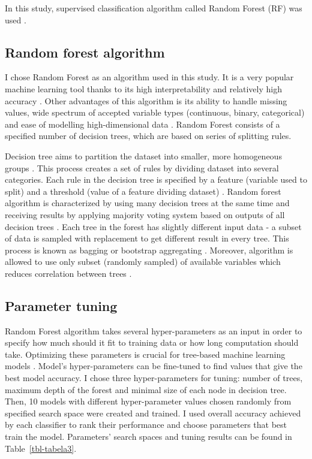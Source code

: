 \documentclass{amuthesis}
\begin{document}
In this study, supervised classification algorithm called Random Forest
(RF) was used \autocite{breiman_random_2001}.

\hypertarget{sec-rf}{%
\subsection{Random forest algorithm}\label{sec-rf}}

I chose Random Forest as an algorithm used in this study. It is a very
popular machine learning tool thanks to its high interpretability and
relatively high accuracy \autocite{qi_random_2012}. Other advantages of
this algorithm is its ability to handle missing values, wide spectrum of
accepted variable types (continuous, binary, categorical) and ease of
modelling high-dimensional data \autocite{qi_random_2012}. Random Forest
consists of a specified number of decision trees, which are based on
series of splitting rules.

Decision tree aims to partition the dataset into smaller, more
homogeneous groups \autocite{kuhn_applied_2013}. This process creates a
set of rules by dividing dataset into several categories. Each rule in
the decision tree is specified by a feature (variable used to split) and
a threshold (value of a feature dividing dataset)
\autocite{sekulic_random_2020}. Random forest algorithm is characterized
by using many decision trees at the same time and receiving results by
applying majority voting system based on outputs of all decision trees
\autocite{kuhn_applied_2013}. Each tree in the forest has slightly
different input data - a subset of data is sampled with replacement to
get different result in every tree. This process is known as bagging or
bootstrap aggregating \autocite{schonlau_random_2020}. Moreover,
algorithm is allowed to use only subset (randomly sampled) of available
variables which reduces correlation between trees
\autocite{sohil_introduction_2022}.

\hypertarget{sec-tuning}{%
\subsection{Parameter tuning}\label{sec-tuning}}

Random Forest algorithm takes several hyper-parameters as an input in
order to specify how much should it fit to training data or how long
computation should take. Optimizing these parameters is crucial for
tree-based machine learning models \autocite{yang_hyperparameter_2020}.
Model's hyper-parameters can be fine-tuned to find values that give the
best model accuracy. I chose three hyper-parameters for tuning: number
of trees, maximum depth of the forest and minimal size of each node in
decision tree. Then, 10 models with different hyper-parameter values
chosen randomly from specified search space were created and trained. I
used overall accuracy achieved by each classifier to rank their
performance and choose parameters that best train the model. Parameters'
search spaces and tuning results can be found in
Table~\ref{tbl-tabela3}.
\end{document}
